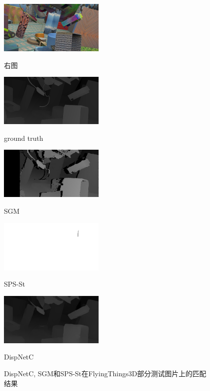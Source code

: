 \begin{figure}[!htb]
\begin{minipage}{0.3\linewidth}
	\end{minipage}
	\hfill
	\begin{minipage}{.3\linewidth}
		\centerline{\includegraphics[width=2in]{figures/cmp_ft3d/r_039}}
		\vspace{-10pt}
		\centerline{右图}
	\end{minipage}
	\hfill
	\begin{minipage}{0.3\linewidth}
		\centerline{\includegraphics[width=2in]{figures/cmp_ft3d/gt_039}}
		\vspace{-10pt}
		\centerline{ground truth}
	\end{minipage}
	\vfill
	\begin{minipage}{0.3\linewidth}
		\centerline{\includegraphics[width=2in]{figures/cmp_ft3d/sgm_039}}
		\vspace{-10pt}
		\centerline{SGM}
	\end{minipage}
	\hfill
	\begin{minipage}{0.3\linewidth}
		\centerline{\includegraphics[width=2in]{figures/cmp_ft3d/sps_039}}
		\vspace{-10pt}
		\centerline{SPS-St}
	\end{minipage}
	\hfill
	\begin{minipage}{0.3\linewidth}
		\centerline{\includegraphics[width=2in]{figures/cmp_ft3d/pred_039}}
		\vspace{-10pt}
		\centerline{DispNetC}
	\end{minipage}
	\caption{DispNetC, SGM和SPS-St在FlyingThings3D部分测试图片上的匹配结果}
	\label{fig:4_3_ft3d_cmp_result}
\end{figure}

